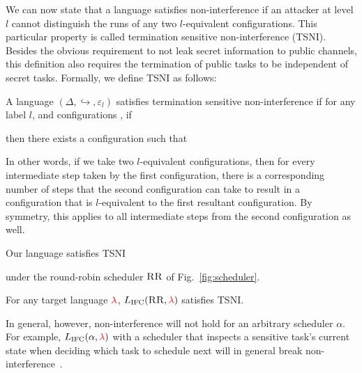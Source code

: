 \documentclass{llncs}
\newif\ifextended
\newcommand{\Red}[1]{{\color{red} #1}}
\begin{document}
We can now state that a language satisfies non-interference if an
attacker at level \ensuremath{l} cannot distinguish the runs of any two \ensuremath{l}-equivalent
configurations.
This particular property is called termination sensitive non-interference
(TSNI).  Besides the obvious requirement to not leak secret information
to public channels, this definition also requires the termination
of public tasks to be independent of secret tasks.
Formally, we define TSNI as follows:

\begin{definition}
  A language \ensuremath{(\Delta,\hookrightarrow,\varepsilon_{l})} satisfies termination
  sensitive non-interference if for any label \ensuremath{l}, and configurations
  , if
  
  then there exists a configuration  such that
  
\end{definition}
In other words, if we take two \ensuremath{l}-equivalent configurations, then for every
intermediate step taken by the first configuration, there is a corresponding
number of steps that the second configuration can take to result in a
configuration that is \ensuremath{l}-equivalent to the first resultant configuration.
By symmetry, this applies to all intermediate steps from the second configuration
as well.
\ifextended
We remark that this notion of non-interfernce is similar to
\emph{progress sensitive non-interference (PSNI)}, which accounts for
leakage via progress (or termination) channels, as used for static
systems~\cite{moore2012precise}.
\fi


Our language satisfies TSNI 
\ifextended
(and thus PSNI)
\fi
under the round-robin scheduler
\ensuremath{\textsc{RR}} of Fig.~\ref{fig:scheduler}.
\begin{theorem}
  \label{thm:rr-tsni}
For any target language \ensuremath{\Red{\lambda}}, \ensuremath{L_\text{IFC}(\textsc{RR},\Red{\lambda})} satisfies TSNI.
\end{theorem}

In general, however, non-interference will not hold for an arbitrary scheduler \ensuremath{\alpha}.
For example, \ensuremath{L_\text{IFC}(\alpha,\Red{\lambda})} with a scheduler that inspects a
sensitive task's current state when deciding which task to schedule next
will in general break non-interference~\cite{russo2006securing,BartheRRS07}.
\end{document}
